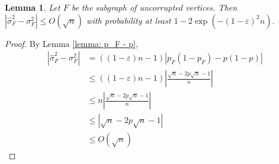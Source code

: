 \documentclass[10pt,onecolumn,letterpaper]{article}
\newtheorem{thm}{Theorem}[section]
\newtheorem{lem}[thm]{Lemma}
\let\epsilon\varepsilon
\begin{document}
\begin{lem}
Let $F$ be the subgraph of uncorrupted vertices. Then $|\hat\sigma_F^2 - \sigma_F^2| \leq O\left(\sqrt{n}\right)$ with probability at least $1-2\exp(-(1-\epsilon)^2n)$.
\end{lem}
\begin{proof}
By Lemma \ref{lemma: p_F - p}, \begin{align*}
    |\hat\sigma_F^2 - \sigma_F^2| &= ((1-\epsilon)n-1)|p_F(1-p_F) - p(1-p)|\\
    &\leq ((1-\epsilon)n-1)\left|\frac{\sqrt{n}-2p\sqrt n -1}{n}\right|\\
    &\leq n\left|\frac{\sqrt{n}-2p\sqrt n -1}{n}\right|\\
    &\leq \left|\sqrt{n}-2p\sqrt n -1\right|\\
    &\leq O(\sqrt{n})
\end{align*}
\end{proof}




\end{document}
